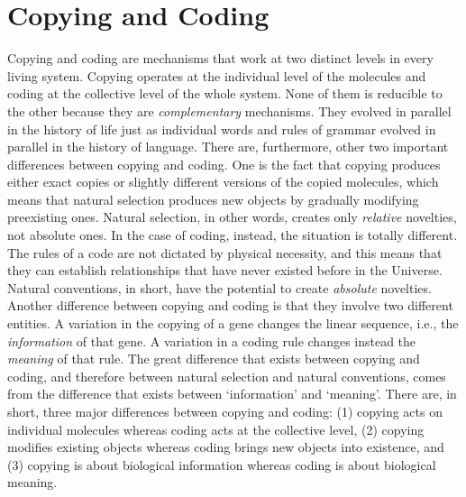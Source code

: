 \documentclass[12pt]{article}
\begin{document}
\section{Copying and Coding}
Copying and coding are mechanisms that work at two distinct levels in every living system. Copying operates at the individual level of the molecules and coding at the collective level of the whole system. None of them is reducible to the other because they are \textit{complementary} mechanisms. They evolved in parallel in the history of life just as individual words and rules of grammar evolved in parallel in the history of language. There are, furthermore, other two important differences between copying and coding. One is the fact that copying produces either exact copies or slightly different versions of the copied molecules, which means that natural selection produces new objects by gradually modifying preexisting ones. Natural selection, in other words, creates only \textit{relative} novelties, not absolute ones. In the case of coding, instead, the situation is totally different. The rules of a code are not dictated by physical necessity, and this means that they can establish relationships that have never existed before in the Universe. Natural conventions, in short, have the potential to create \textit{absolute} novelties. Another difference between copying and coding is that they involve two different entities. A variation in the copying of a gene changes the linear sequence, i.e., the \textit{information} of that gene. A variation in a coding rule changes instead the \textit{meaning} of that rule. The great difference that exists between copying and coding, and therefore between natural selection and natural conventions, comes from the difference that exists between `information' and `meaning'. There are, in short, three major differences between copying and coding: (1) copying acts on individual molecules whereas coding acts at the collective level, (2) copying modifies existing objects whereas coding brings new objects into existence, and (3) copying is about biological information whereas coding is about biological meaning. 
\end{document}
